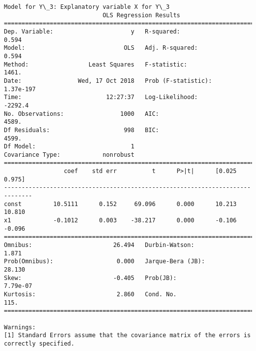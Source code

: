 \documentclass[11pt]{article}
\begin{document}
\begin{Verbatim}[commandchars=\\\{\}]
Model for Y\_3: Explanatory variable X for Y\_3
                            OLS Regression Results                            
==============================================================================
Dep. Variable:                      y   R-squared:                       0.594
Model:                            OLS   Adj. R-squared:                  0.594
Method:                 Least Squares   F-statistic:                     1461.
Date:                Wed, 17 Oct 2018   Prob (F-statistic):          1.37e-197
Time:                        12:27:37   Log-Likelihood:                -2292.4
No. Observations:                1000   AIC:                             4589.
Df Residuals:                     998   BIC:                             4599.
Df Model:                           1                                         
Covariance Type:            nonrobust                                         
==============================================================================
                 coef    std err          t      P>|t|      [0.025      0.975]
------------------------------------------------------------------------------
const         10.5111      0.152     69.096      0.000      10.213      10.810
x1            -0.1012      0.003    -38.217      0.000      -0.106      -0.096
==============================================================================
Omnibus:                       26.494   Durbin-Watson:                   1.871
Prob(Omnibus):                  0.000   Jarque-Bera (JB):               28.130
Skew:                          -0.405   Prob(JB):                     7.79e-07
Kurtosis:                       2.860   Cond. No.                         115.
==============================================================================

Warnings:
[1] Standard Errors assume that the covariance matrix of the errors is correctly specified.



\end{Verbatim}
\end{document}

